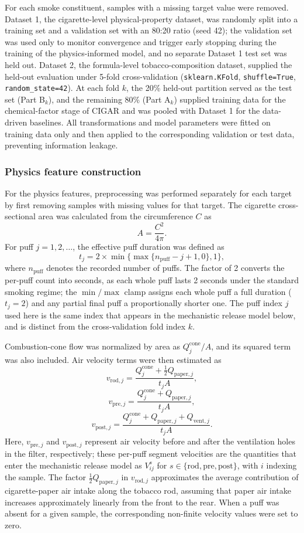 \documentclass[11pt]{article}
\begin{document}
For each smoke constituent, samples with a missing target value were removed.
Dataset 1, the cigarette-level physical-property dataset, was randomly
split into a training set and a validation set with an 80:20 ratio (seed
42); the validation set was used only to monitor convergence and trigger
early stopping during the training of the physics-informed model, and no
separate Dataset 1 test set was held out. Dataset 2, the formula-level
tobacco-composition dataset, supplied the held-out evaluation under 5-fold
cross-validation (\texttt{sklearn.KFold}, \texttt{shuffle=True},
\texttt{random\_state=42}). At each fold $k$, the 20\% held-out partition
served as the test set (Part B$_k$), and the remaining 80\% (Part A$_k$)
supplied training data for the chemical-factor stage of CIGAR and was
pooled with Dataset 1 for the data-driven baselines. All transformations
and model parameters were fitted on training data only and then applied
to the corresponding validation or test data, preventing information
leakage.

\subsubsection*{Physics feature construction}

For the physics features, preprocessing was performed separately for each target by first removing samples with missing values for that target. The cigarette cross-sectional area was calculated from the circumference $C$ as
\[
A=\frac{C^2}{4\pi}.
\]
For puff $j=1,2,\ldots$, the effective puff duration was defined as
\[
t_j=2\times\min\{\max\{n_{\mathrm{puff}}-j+1,0\},1\},
\]
where $n_{\mathrm{puff}}$ denotes the recorded number of puffs. The factor of 2 converts the per-puff count into seconds, as each whole puff lasts 2 seconds under the standard smoking regime; the $\min/\max$ clamp assigns each whole puff a full duration ($t_j=2$) and any partial final puff a proportionally shorter one. The puff index $j$ used here is the same index that appears in the mechanistic release model below, and is distinct from the cross-validation fold index $k$.

Combustion-cone flow was normalized by area as $Q_{j}^{\mathrm{cone}}/A$, and its squared term was also included. Air velocity terms were then estimated as
\[
v_{\mathrm{rod},j}=\frac{Q_{j}^{\mathrm{cone}}+\frac{1}{2}Q_{\mathrm{paper},j}}{t_jA},
\]
\[
v_{\mathrm{pre},j}=\frac{Q_{j}^{\mathrm{cone}}+Q_{\mathrm{paper},j}}{t_jA},
\]
\[
v_{\mathrm{post},j}=\frac{Q_{j}^{\mathrm{cone}}+Q_{\mathrm{paper},j}+Q_{\mathrm{vent},j}}{t_jA}.
\]
Here, $v_{\mathrm{pre},j}$ and $v_{\mathrm{post},j}$ represent air velocity before and after the ventilation holes in the filter, respectively; these per-puff segment velocities are the quantities that enter the mechanistic release model as $V_{ij}^{s}$ for $s\in\{\mathrm{rod},\mathrm{pre},\mathrm{post}\}$, with $i$ indexing the sample. The factor $\frac{1}{2}Q_{\mathrm{paper},j}$ in $v_{\mathrm{rod},j}$ approximates the average contribution of cigarette-paper air intake along the tobacco rod, assuming that paper air intake increases approximately linearly from the front to the rear. When a puff was absent for a given sample, the corresponding non-finite velocity values were set to zero.
\end{document}
